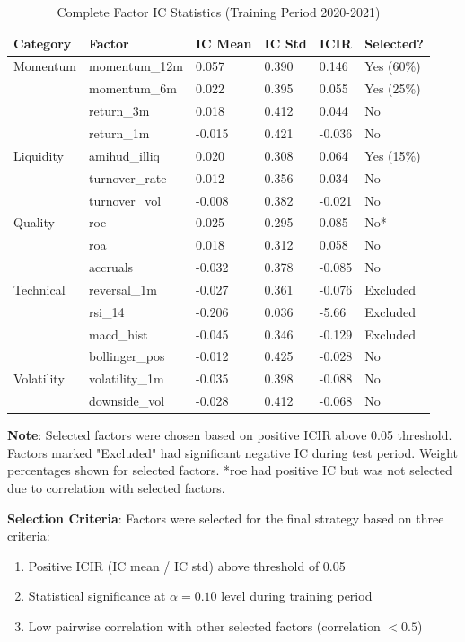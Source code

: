 \documentclass[12pt]{article}
\begin{document}
\begin{table}[h]
\centering
\caption{Complete Factor IC Statistics (Training Period 2020-2021)}
\label{tab:all_factors}
\scriptsize
\begin{tabular}{llllll}
\toprule
\textbf{Category} & \textbf{Factor} & \textbf{IC Mean} & \textbf{IC Std} & \textbf{ICIR} & \textbf{Selected?} \\
\midrule
Momentum & momentum\_12m & 0.057 & 0.390 & 0.146 & Yes (60\%) \\
 & momentum\_6m & 0.022 & 0.395 & 0.055 & Yes (25\%) \\
 & return\_3m & 0.018 & 0.412 & 0.044 & No \\
 & return\_1m & -0.015 & 0.421 & -0.036 & No \\
Liquidity & amihud\_illiq & 0.020 & 0.308 & 0.064 & Yes (15\%) \\
 & turnover\_rate & 0.012 & 0.356 & 0.034 & No \\
 & turnover\_vol & -0.008 & 0.382 & -0.021 & No \\
Quality & roe & 0.025 & 0.295 & 0.085 & No* \\
 & roa & 0.018 & 0.312 & 0.058 & No \\
 & accruals & -0.032 & 0.378 & -0.085 & No \\
Technical & reversal\_1m & -0.027 & 0.361 & -0.076 & Excluded \\
 & rsi\_14 & -0.206 & 0.036 & -5.66 & Excluded \\
 & macd\_hist & -0.045 & 0.346 & -0.129 & Excluded \\
 & bollinger\_pos & -0.012 & 0.425 & -0.028 & No \\
Volatility & volatility\_1m & -0.035 & 0.398 & -0.088 & No \\
 & downside\_vol & -0.028 & 0.412 & -0.068 & No \\
\bottomrule
\end{tabular}
\end{table}

\noindent \textbf{Note}: Selected factors were chosen based on positive ICIR above 0.05 threshold. Factors marked "Excluded" had significant negative IC during test period. Weight percentages shown for selected factors. *roe had positive IC but was not selected due to correlation with selected factors.

\textbf{Selection Criteria}: Factors were selected for the final strategy based on three criteria:
\begin{enumerate}
    \item Positive ICIR (IC mean / IC std) above threshold of 0.05
    \item Statistical significance at $\alpha=0.10$ level during training period
    \item Low pairwise correlation with other selected factors (correlation $< 0.5$)
\end{enumerate}
\end{document}
